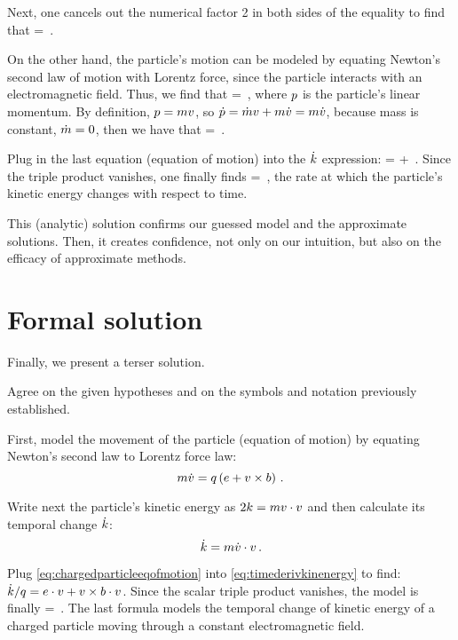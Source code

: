 Next, one cancels out the numerical factor 2 in both sides of the equality to find that
%
\beq
  \ekin = \mass\dt\vel\iprod\vel\,.
\eeq

On the other hand, the particle's motion can be modeled by equating Newton's second law of motion with Lorentz force, since the particle interacts with an electromagnetic field. Thus, we find that
%
\beq
  \dt\mom = \echarge\parth{\efield + \vel\cprod\mfield}\,,
\eeq
%
where $p$ is the particle's linear momentum. By definition, $p = mv$, so $\dot{p} = \dot{m}v + m\dot{v} = m\dot{v}$, because mass is constant, $\dot{m} = 0$, then we have that
%
\beq
  \mass\dt\vel = \echarge\parth{\efield + \vel\cprod\mfield}\,.
\eeq

Plug in the last equation (equation of motion) into the $\dot{k}$ expression:
%
\beq
  \dt\ekin = \echarge\efield\iprod\vel + \echarge\parth{\vel\cprod\mfield}\iprod\vel\,.
\eeq
%
Since the triple product vanishes, one finally finds
%
\beq
  \dt\ekin = \echarge\efield\iprod\vel\,,
\eeq
%
the rate at which the particle's kinetic energy changes with respect to time.

This (analytic) solution confirms our guessed model and the approximate solutions. Then, it creates confidence, not only on our intuition, but also on the efficacy of approximate methods.


\section{Formal solution}
%
Finally, we present a terser solution.

Agree on the given hypotheses and on the symbols and notation previously established.

First, model the movement of the particle (equation of motion) by equating Newton's second law to Lorentz force law:
%
\begin{equation}\label{eq:chargedparticleeqofmotion}
  m\dot{v} = q\left({e + v\times b}\right)\,.
\end{equation}

Write next the particle's kinetic energy as $2k = mv\cdot v$ and then calculate its temporal change $\dot{k}$:
%
\begin{equation}\label{eq:timederivkinenergy}
  \dot{k} = m\dot{v}\cdot v\,.
\end{equation}

Plug \cref{eq:chargedparticleeqofmotion} into \cref{eq:timederivkinenergy} to find: $\dot{k}/q = e\cdot v + v\times b\cdot v$. Since the scalar triple product vanishes, the model is finally
%
\beq
  \dt\ekin = \echarge\efield\iprod\vel\,.
\eeq
%
The last formula models the temporal change of kinetic energy of a charged particle moving through a constant electromagnetic field.

